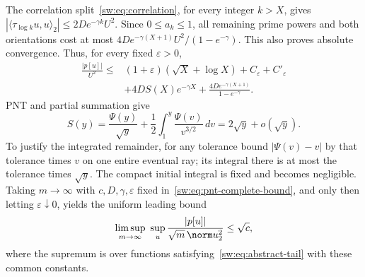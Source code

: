 \documentclass[11pt,a4paper]{article}
\numberwithin{equation}{section}
\theoremstyle{definition}\newtheorem{definition}[theorem]{Definition}
\theoremstyle{remark}\newtheorem{remark}[theorem]{Remark}
\begin{document}
The correlation split~\eqref{sw:eq:correlation}, for every integer $k>X$, gives
$|\langle\tau_{\log k}u,u\rangle_2|\le2De^{-\gamma k}U^2$.
Since $0\le a_k\le1$, all remaining prime powers and both orientations cost at most
$4De^{-\gamma(X+1)}U^2/(1-e^{-\gamma})$. This also proves absolute convergence. Thus, for every fixed $\varepsilon>0$,
\begin{equation}\label{sw:eq:pnt-complete-bound}
 \begin{split}
 \frac{|p[u]|}{U^2}\le{}&(1+\varepsilon)(\sqrt X+\log X)
                  +C_\varepsilon+C'_\varepsilon\\
 &+4D S(X)e^{-\gamma X}
       +\frac{4De^{-\gamma(X+1)}}{1-e^{-\gamma}}.
 \end{split}
\end{equation}
PNT and partial summation give
\begin{equation}\label{sw:eq:S-asymptotic}
 S(y)=\frac{\Psi(y)}{\sqrt y}
       +\frac12\int_1^y\frac{\Psi(v)}{v^{3/2}}\,dv
     =2\sqrt y+o(\sqrt y).
\end{equation}
To justify the integrated remainder, for any tolerance bound $|\Psi(v)-v|$ by that tolerance times $v$ on one entire eventual ray; its integral there is at most the tolerance times $\sqrt y$. The compact initial integral is fixed and becomes negligible. Taking $m\to\infty$ with $c,D,\gamma,\varepsilon$ fixed in~\eqref{sw:eq:pnt-complete-bound}, and only then letting $\varepsilon\downarrow0$, yields the uniform leading bound
\begin{equation}\label{sw:eq:concentration-prime}
 \limsup_{m\to\infty}\ \sup_u
       \frac{|p[u]|}{\sqrt m\,\norm u_2^2}\le\sqrt c,
\end{equation}
where the supremum is over functions satisfying~\eqref{sw:eq:abstract-tail} with these common constants.
\end{document}
